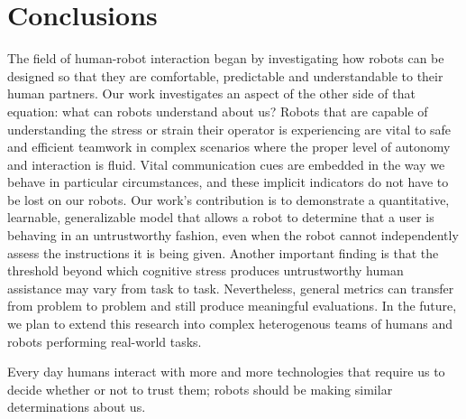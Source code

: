 \documentclass{sig-alternate}
\begin{document}
\section{Conclusions}

The field of human-robot interaction began by investigating how robots
can be designed so that they are comfortable, predictable and
understandable to their human partners.  Our work investigates an
aspect of the other side of that equation: what can robots understand
about us?  Robots that are capable of understanding the stress or
strain their operator is experiencing are vital to safe and efficient
teamwork in complex scenarios where the proper level of autonomy and
interaction is fluid.  Vital communication cues are embedded in the
way we behave in particular circumstances, and these implicit
indicators do not have to be lost on our robots.  Our work's
contribution is to demonstrate a quantitative, learnable,
generalizable model that allows a robot to determine that a user is
behaving in an untrustworthy fashion, even when the robot cannot
independently assess the instructions it is being given.  Another
important finding is that the threshold beyond which cognitive stress
produces untrustworthy human assistance may vary from task to task.
Nevertheless, general metrics can transfer from problem to problem and
still produce meaningful evaluations.  In the future, we plan to
extend this research into complex heterogenous teams of humans and
robots performing real-world tasks.

Every day humans interact with more and more technologies that require
us to decide whether or not to trust them; robots should be making
similar determinations about us.

\end{document}
